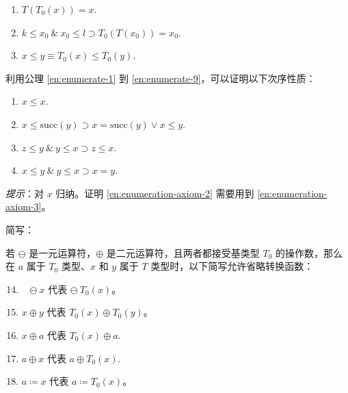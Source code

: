 \documentclass[twoside,11pt,fontset=none]{ctexbook}
\begin{document}
\begin{enumerate}[wide, nosep, label=(\arabic*)]
	\tabto*{1.8em}\& $k_n = \text{succ}(k_{n-1}) = T$.max.
	
	把类型定义为子界的一般形式是：
	
	\quad \textbf{type} $T=k\,.\,.\,l;$
	
	\noindent
	其中 $k$ 和 $l$ 属于基类型 $T_0$。
	
	该类型的附加公理是：
	
	\tabto*{.9em}(10) $T$.min $= k$
	
	\tabto*{1.8em}\& $T$.max $= l$.

	\setcounter{enumi}{10}
	\item $T(T_0(x)) = x$.

	\item $k \leqslant x_0\ \&\ x_0 \leqslant l \supset T_0(T(x_0)) = x_0$.

	\item $x \leqslant y \equiv T_0(x) \leqslant T_0(y).$
\end{enumerate}

利用公理 \ref{en:enumerate-1} 到 \ref{en:enumerate-9}，可以证明以下次序性质：

\begin{enumerate}[wide, nosep, label=(T\arabic*)]
	\item $x \leqslant x$.

	\item \label{en:enumeration-axiom-2}
	$x \leqslant \text{succ}(y) \supset x = \text{succ}(y) \vee x \leqslant y$.
	
	\item \label{en:enumeration-axiom-3}
	$z \leqslant y\ \&\ y \leqslant x \supset z \leqslant x.$
	
	\item $x \leqslant y\ \&\ y \leqslant x \supset x = y.$
\end{enumerate}

\noindent
\textit{提示}：对 $x$ 归纳。证明 \ref{en:enumeration-axiom-2} 需要用到 \ref{en:enumeration-axiom-3}。

\noindent
简写：

\noindent
若 $\ominus$ 是一元运算符，$\oplus$ 是二元运算符，且两者都接受基类型 $T_0$ 的操作数，那么在 $a$ 属于 $T_0$ 类型、$x$ 和 $y$ 属于 $T$ 类型时，以下简写允许省略转换函数：

\begin{enumerate}[wide, nosep, label=(\arabic*)]
	\setcounter{enumi}{13}
	
	\item ~ $\ominus\ x$ 代表 $\ominus\ T_0(x)$。

	\item $x \oplus y$ 代表 $T_0(x) \oplus T_0(y)$。
	
	\item $x \oplus a$ 代表 $T_0(x) \oplus a.$

	\item $a \oplus x$ 代表 $a \oplus T_0(x).$

	\item $a \coloneq x$ 代表 $a\coloneq T_0(x)$。
\end{enumerate}
\end{document}
